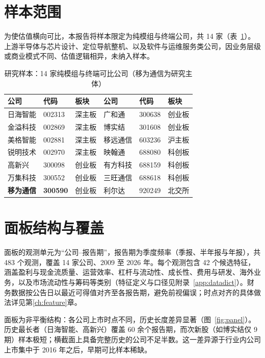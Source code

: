 \documentclass[UTF8, a4paper, fontset=none, zihao=-4]{ctexrep}
\begin{document}
\section{样本范围}
为使估值横向可比，本报告将样本限定为纯模组与终端公司，共 14 家（表~\ref{tab:firms}）。上游半导体与芯片设计、定位导航整机、以及软件与运维服务类公司，因业务层级或商业模式不同、估值逻辑相异，未纳入样本。

\begin{table}[htbp]
\caption{研究样本：14 家纯模组与终端可比公司（移为通信为研究主体）}
\label{tab:firms}
\renewcommand{\arraystretch}{1.3}
\begin{tabular*}{\textwidth}{@{\extracolsep{\fill}}llllll@{}}
\toprule
\textbf{\color{brandblue}公司} & \textbf{\color{brandblue}代码} & \textbf{\color{brandblue}板块}
 & \textbf{\color{brandblue}公司} & \textbf{\color{brandblue}代码} & \textbf{\color{brandblue}板块}\\
\midrule
日海智能 & 002313 & 深主板 & 广和通 & 300638 & 创业板\\
金溢科技 & 002869 & 深主板 & 博实结 & 301608 & 创业板\\
美格智能 & 002881 & 深主板 & 移远通信 & 603236 & 沪主板\\
锐明技术 & 002970 & 深主板 & 映翰通 & 688080 & 科创板\\
高新兴 & 300098 & 创业板 & 有方科技 & 688159 & 科创板\\
万集科技 & 300552 & 创业板 & 三旺通信 & 688618 & 科创板\\
\textbf{移为通信} & \textbf{300590} & 创业板 & 利尔达 & 920249 & 北交所\\
\bottomrule
\end{tabular*}
\end{table}

\section{面板结构与覆盖}
面板的观测单元为“公司–报告期”，报告期为季度频率（季报、半年报与年报），共 483 个观测，覆盖 14 家公司、2009 至 2026 年。每个观测包含 42 个候选特征，涵盖盈利与现金流质量、运营效率、杠杆与流动性、成长性、费用与研发、海外业务，以及市场流动性与筹码等类别（特征定义与口径见附录~\ref{app:datadict}）。财务数据按公告日以最近可得值对齐至各报告期，避免前视偏误；时点对齐的具体做法详见第\ref{ch:feature}章。

面板为非平衡结构：各公司上市时点不同，历史长度差异显著（图~\ref{fig:panel}）。历史最长者（日海智能、高新兴）覆盖 60 余个报告期，而次新股（如博实结仅 9 期）样本极短；横截面上具备完整历史的公司不足半数。这一差异源于行业内公司上市集中于 2016 年之后，早期可比样本稀缺。
\end{document}
